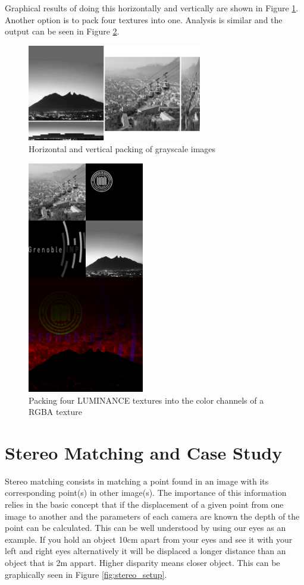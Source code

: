 \documentclass[conference]{IEEEtran}
\begin{document}
\begin{itemize}
Graphical results of doing this horizontally and vertically are shown in Figure \ref{fig:hor_ver_packing}. Another option is to pack four textures into one. Analysis is similar and the output can be seen in Figure \ref{fig:gray2color_packing}.
\end{itemize}

\begin{figure}[!t]
 \centering
 \includegraphics[width=3.0in]{hor_ver_packing}
 \caption{Horizontal and vertical packing of grayscale images}
 \label{fig:hor_ver_packing}
\end{figure}

\begin{figure}[!t]
 \centering
 \includegraphics[width=2.0in]{gray2color_packing}
 \caption{Packing four LUMINANCE textures into the color channels of a RGBA texture}
 \label{fig:gray2color_packing}
\end{figure}


\section{Stereo Matching and Case Study}
Stereo matching consists in matching a point found in an image with its corresponding point(s) in other image(s). The importance of this information relies in the basic concept that if the displacement of a given point from one image to another and the parameters of each camera are known the depth of the point can be calculated. This can be well understood by using our eyes as an example. If you hold an object 10cm apart from your eyes and see it with your left and right eyes alternatively it will be displaced a longer distance than an object that is 2m appart. Higher disparity means closer object. This can be graphically seen in Figure \ref{fig:stereo_setup}.
\end{document}
